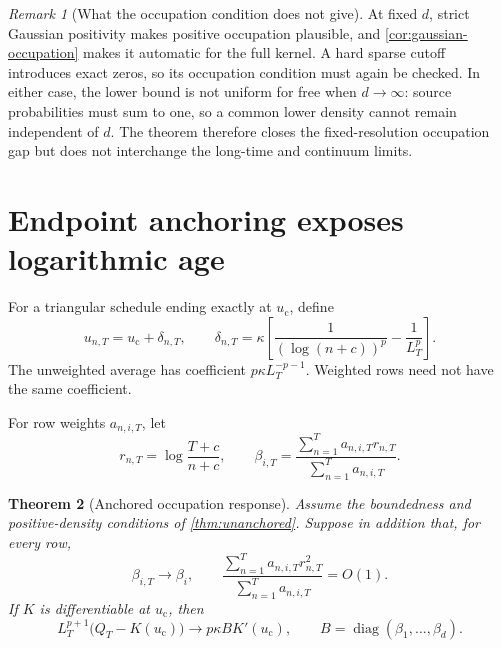 \documentclass[11pt]{article}
\newtheorem{theorem}{Theorem}[section]
\theoremstyle{definition}
\theoremstyle{remark}
\newtheorem{remark}[theorem]{Remark}
\newcommand{\uc}{u_{\mathrm c}}
\newcommand{\diag}{\operatorname{diag}}
\begin{document}
\begin{remark}[What the occupation condition does not give]
\label{rem:occupation-limit}
At fixed $d$, strict Gaussian positivity makes positive occupation plausible,
and \cref{cor:gaussian-occupation} makes it automatic for the full kernel.
A hard sparse cutoff introduces exact zeros, so its occupation condition must
again be checked.  In either case, the lower bound is not uniform for free
when $d\to\infty$: source probabilities must sum to one, so a common lower
density cannot remain independent of $d$.  The theorem therefore closes the
fixed-resolution occupation gap but does not interchange the long-time and
continuum limits.
\end{remark}

\section{Endpoint anchoring exposes logarithmic age}
\label{sec:anchored}

For a triangular schedule ending exactly at $\uc$, define
\begin{equation}\label{eq:anchored-schedule}
  u_{n,T}=\uc+\delta_{n,T},\qquad
  \delta_{n,T}=\kappa\left[
    \frac1{(\log(n+c))^p}-\frac1{L_T^p}
  \right].
\end{equation}
The unweighted average has coefficient $p\kappa L_T^{-p-1}$.
Weighted rows need not have the same coefficient.

For row weights $a_{n,i,T}$, let
\begin{equation}\label{eq:log-age}
  r_{n,T}=\log\frac{T+c}{n+c},\qquad
  \beta_{i,T}=
  \frac{\sum_{n=1}^Ta_{n,i,T}r_{n,T}}
       {\sum_{n=1}^Ta_{n,i,T}}.
\end{equation}

\begin{theorem}[Anchored occupation response]\label{thm:anchored}
Assume the boundedness and positive-density conditions of
\cref{thm:unanchored}.  Suppose in addition that, for every row,
\begin{equation}\label{eq:age-assumptions}
  \beta_{i,T}\longrightarrow\beta_i,\qquad
  \frac{\sum_{n=1}^Ta_{n,i,T}r_{n,T}^2}
       {\sum_{n=1}^Ta_{n,i,T}}=O(1).
\end{equation}
If $K$ is differentiable at $\uc$, then
\begin{equation}\label{eq:anchored-matrix-response}
  L_T^{p+1}\bigl(Q_T-K(\uc)\bigr)
  \longrightarrow p\kappa B K'(\uc),
  \qquad
  B=\diag(\beta_1,\ldots,\beta_d).
\end{equation}
\end{theorem}
\end{document}
